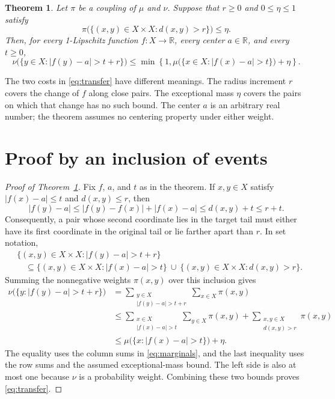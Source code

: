 \documentclass[a4paper,11pt]{article}
\newtheorem{theorem}{Theorem}
\begin{document}
\begin{theorem}\label{thm:transfer}
Let $\pi$ be a coupling of $\mu$ and $\nu$. Suppose that $r\ge0$ and
$0\le\eta\le1$ satisfy
\[
 \pi\bigl(\{(x,y)\in X\times X:d(x,y)>r\}\bigr)\le\eta.
\]
Then, for every 1-Lipschitz function $f:X\to\mathbb R$, every center
$a\in\mathbb R$, and every $t\ge0$,
\begin{equation}\label{eq:transfer}
 \nu\bigl(\{y\in X:|f(y)-a|>t+r\}\bigr)
 \le
 \min\left\{1,
 \mu\bigl(\{x\in X:|f(x)-a|>t\}\bigr)+\eta\right\}.
\end{equation}
\end{theorem}

The two costs in \eqref{eq:transfer} have different meanings. The radius
increment $r$ covers the change of $f$ along close pairs. The exceptional
mass $\eta$ covers the pairs on which that change has no such bound.
The center $a$ is an arbitrary real number; the theorem assumes no
centering property under either weight.

\section{Proof by an inclusion of events}

\begin{proof}[Proof of Theorem~\ref{thm:transfer}]
Fix $f$, $a$, and $t$ as in the theorem. If $x,y\in X$ satisfy
$|f(x)-a|\le t$ and $d(x,y)\le r$, then
\[
 |f(y)-a|
 \le |f(y)-f(x)|+|f(x)-a|
 \le d(x,y)+t
 \le r+t.
\]
Consequently, a pair whose second coordinate lies in the target tail
must either have its first coordinate in the original tail or lie farther
apart than $r$. In set notation,
\begin{align*}
 &\{(x,y)\in X\times X:|f(y)-a|>t+r\}\\
 &\quad\subseteq
 \{(x,y)\in X\times X:|f(x)-a|>t\}
 \ \cup\ \{(x,y)\in X\times X:d(x,y)>r\}.
\end{align*}
Summing the nonnegative weights $\pi(x,y)$ over this inclusion gives
\begin{align*}
 \nu\bigl(\{y:|f(y)-a|>t+r\}\bigr)
 &=\sum_{\substack{y\in X\\|f(y)-a|>t+r}}
       \sum_{x\in X}\pi(x,y)\\
 &\le
 \sum_{\substack{x\in X\\|f(x)-a|>t}}
       \sum_{y\in X}\pi(x,y)
 +\sum_{\substack{x,y\in X\\d(x,y)>r}}\pi(x,y)\\
 &\le \mu\bigl(\{x:|f(x)-a|>t\}\bigr)+\eta.
\end{align*}
The equality uses the column sums in \eqref{eq:marginals}, and the last
inequality uses the row sums and the assumed exceptional-mass bound.
The left side is also at most one because $\nu$ is a probability weight.
Combining these two bounds proves \eqref{eq:transfer}.
\end{proof}
\end{document}
